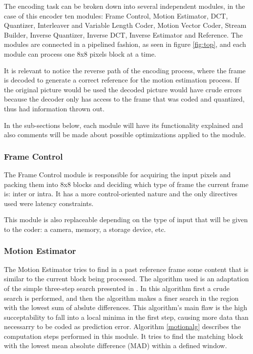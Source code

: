 \documentclass[a4paper, 12pt]{article}
\begin{document}
	The encoding task can be broken down into several independent modules, in the case of this encoder ten modules: Frame Control, Motion Estimator, DCT, Quantizer, Interleaver and Variable Length Coder, Motion Vector Coder, Stream Builder, Inverse Quantizer, Inverse DCT, Inverse Estimator and Reference. The modules are connected in a pipelined fashion, as seen in figure \ref{fig:top}, and each module can process one 8x8 pixels block at a time.
	
	It is relevant to notice the reverse path of the encoding process, where the frame is decoded to generate a correct reference for the motion estimation process. If the original picture would be used the decoded picture would have crude errors because the decoder only has access to the frame that was coded and quantized, thus had information thrown out.
	
	In the sub-sections below, each module will have its functionality explained and also comments will be made about possible optimizations applied to the module.

\subsubsection{Frame Control}

	The Frame Control module is responsible for acquiring the input pixels and packing them into 8x8 blocks and deciding which type of frame the current frame is: inter or intra. It has a more control-oriented nature and the only directives used were latency constraints. 

	This module is also replaceable depending on the type of input that will be given to the coder: a camera, memory, a storage device, etc.

\subsubsection{Motion Estimator}
	The Motion Estimator tries to find in a past reference frame some content that is similar to the current block being processed. The algorithm used is an adaptation of the simple three-step search presented in \cite{motiontss}. In this algorithm first a crude search is performed, and then the algorithm makes a finer search in the region with the lowest sum of abslute differences. This algorithm's main flaw is the high succeptability to fall into a local minima in the first step, causing more data than necessarry to be coded as prediction error. Algorithm \ref{motionalg} describes the computation steps performed in this module. It tries to find the matching block with the lowest mean absolute difference (MAD) within a defined window. 
\end{document}
